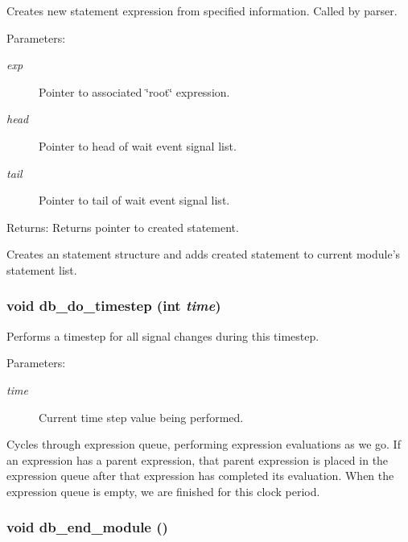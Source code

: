 Creates new statement expression from specified information. Called by parser. 

\begin{Desc}
\item[Parameters:]
\begin{description}
\item[{\em exp}]Pointer to associated \char`\"{}root\char`\"{} expression. \item[{\em head}]Pointer to head of wait event signal list. \item[{\em tail}]Pointer to tail of wait event signal list.\end{description}
\end{Desc}
\begin{Desc}
\item[Returns:]Returns pointer to created statement.\end{Desc}
Creates an statement structure and adds created statement to current module's statement list. 
\subsubsection{\setlength{\rightskip}{0pt plus 5cm}void db\_\-do\_\-timestep (int {\em time})}\label{db_8h_a25}


Performs a timestep for all signal changes during this timestep. 

\begin{Desc}
\item[Parameters:]
\begin{description}
\item[{\em time}]Current time step value being performed.\end{description}
\end{Desc}
Cycles through expression queue, performing expression evaluations as we go. If an expression has a parent expression, that parent expression is placed in the expression queue after that expression has completed its evaluation. When the expression queue is empty, we are finished for this clock period. 
\subsubsection{\setlength{\rightskip}{0pt plus 5cm}void db\_\-end\_\-module ()}\label{db_8h_a9}


